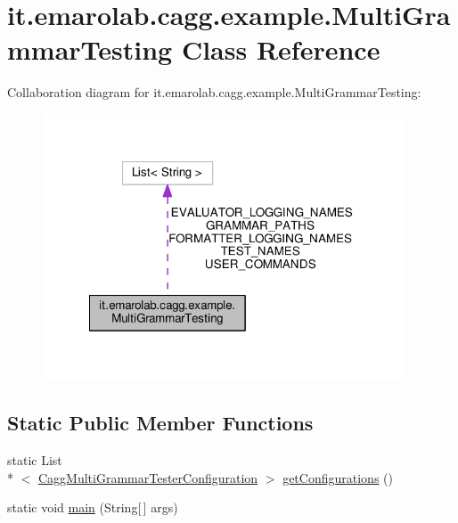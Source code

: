 \hypertarget{classit_1_1emarolab_1_1cagg_1_1example_1_1MultiGrammarTesting}{\section{it.\-emarolab.\-cagg.\-example.\-Multi\-Grammar\-Testing Class Reference}
\label{classit_1_1emarolab_1_1cagg_1_1example_1_1MultiGrammarTesting}
}


Collaboration diagram for it.\-emarolab.\-cagg.\-example.\-Multi\-Grammar\-Testing\-:\nopagebreak
\begin{figure}[H]
\begin{center}
\leavevmode
\includegraphics[width=302pt]{classit_1_1emarolab_1_1cagg_1_1example_1_1MultiGrammarTesting__coll__graph}
\end{center}
\end{figure}
\subsection*{Static Public Member Functions}
\begin{DoxyCompactItemize}
\item 
static List\\*
$<$ \hyperlink{classit_1_1emarolab_1_1cagg_1_1interfaces_1_1CaggMultiGrammarTesterConfiguration}{Cagg\-Multi\-Grammar\-Tester\-Configuration} $>$ \hyperlink{classit_1_1emarolab_1_1cagg_1_1example_1_1MultiGrammarTesting_a5a16e215571999ebfbd9b233ea0602f3}{get\-Configurations} ()
\item 
static void \hyperlink{classit_1_1emarolab_1_1cagg_1_1example_1_1MultiGrammarTesting_ad327a10a31b545b5fb7cc5e484ed0fde}{main} (String\mbox{[}$\,$\mbox{]} args)
\end{DoxyCompactItemize}
